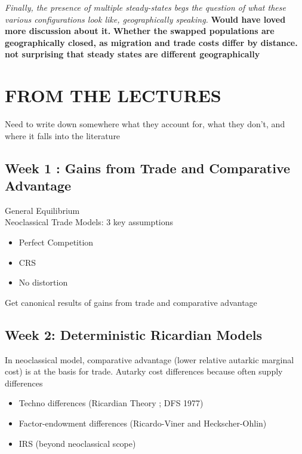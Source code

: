 \documentclass[12pt, final]{article}
\begin{document}
\textit{Finally, the presence of multiple steady-states begs the question of what these various configurations look like, geographically speaking.} \textbf{Would have loved more discussion about it. } \textbf{Whether the swapped populations are geographically closed, as migration and trade costs differ by distance. not surprising that steady states are different geographically}




\newpage











\newpage



\section{FROM THE LECTURES} %
\label{sec:from_the_lectures}

Need to write down somewhere what they account for, what they don't, and where it falls into the literature

\subsection{Week 1 : Gains from Trade and Comparative Advantage} %
\label{sub:week_1_gains_from_trade_and_comparative_advantage}

General Equilibrium
\\
Neoclassical Trade Models: 3 key assumptions
\begin{itemize}
    \item Perfect Competition
    \item CRS
    \item No distortion
\end{itemize}
Get canonical results of gains from trade and comparative advantage

\subsection{Week 2: Deterministic Ricardian Models} %
\label{sub:week_2_deterministic_ricardian_models}

In neoclassical model, comparative advantage (lower relative autarkic marginal cost) is at the basis for trade. Autarky cost differences because often supply differences
\begin{itemize}
    \item Techno differences (Ricardian Theory ; DFS 1977)
    \item Factor-endowment differences (Ricardo-Viner and Heckscher-Ohlin)
    \item IRS (beyond neoclassical scope)
\end{itemize}
\end{document}
